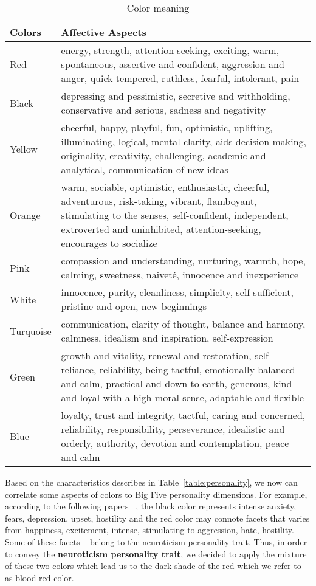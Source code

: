 \begin{table} [h]
\centering
\begin{tabular}{ | m{8em} | m{25em}| } 
\hline
\textbf{Colors} & \textbf{Affective Aspects}  \\
\hline
Red & energy, strength, attention-seeking, exciting, warm, spontaneous, assertive and confident,
aggression and anger, quick-tempered, ruthless, fearful, intolerant, pain  \\
\hline 
Black & depressing and pessimistic, secretive and withholding, conservative and serious,
sadness and negativity  \\
\hline 
Yellow & cheerful, happy, playful, fun, optimistic, uplifting, illuminating, logical, mental clarity,
aids decision-making, originality, creativity, challenging, academic and analytical, communication of new ideas   \\
\hline 
Orange & warm, sociable, optimistic, enthusiastic, cheerful, adventurous, risk-taking, vibrant,
flamboyant, stimulating to the senses,  self-confident, independent, extroverted and uninhibited,
attention-seeking, encourages to socialize  \\
\hline 
Pink & compassion and understanding, nurturing, warmth, hope, calming, sweetness,
naiveté, innocence and inexperience  \\
\hline
White & innocence, purity, cleanliness, simplicity, self-sufficient, pristine and open, new beginnings  \\
\hline
Turquoise &  communication, clarity of thought, balance and harmony, calmness,
idealism and inspiration, self-expression \\
\hline
Green & growth and vitality, renewal and restoration, self-reliance, reliability,
being tactful, emotionally balanced and calm, practical and down to earth, generous, kind and loyal
with a high moral sense, adaptable and flexible  \\
\hline
Blue &  loyalty, trust and integrity, tactful, caring and concerned, reliability, responsibility,
perseverance, idealistic and orderly, authority, devotion and contemplation, peace and calm \\
\hline
\end{tabular}
\caption{Color meaning}
\label{table:color}
\end{table}

Based on the characteristics describes in Table~\ref{table:personality},
we now can correlate some aspects of colors to Big Five personality dimensions.
For example, according to the following papers ~\cite{alschuler1943easel,schaie1961scaling},
the black color represents intense anxiety, fears, depression, upset, hostility and the red color may
connote facets that varies from happiness, excitement, intense, stimulating to aggression, hate, hostility.
Some of these facets ~\cite{costa1988catalog} belong to the neuroticism personality trait.
Thus, in order to convey the \textbf{neuroticism personality trait}, we decided to apply the
mixture of these two colors which lead us to the dark shade of the red which we refer to as blood-red color.

